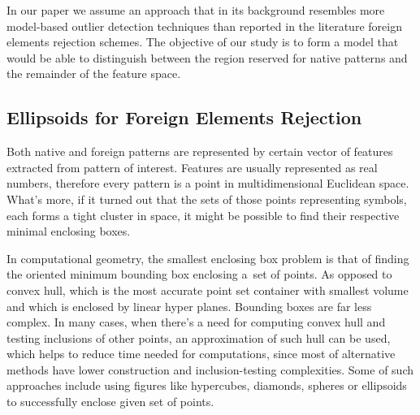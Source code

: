 \documentclass{llncs}
\begin{document}
In our paper we assume an approach that in its background resembles more model-based outlier detection techniques than reported in the literature foreign elements rejection schemes. The objective of our study is to form a model that would be able to distinguish between the region reserved for native patterns and the remainder of the feature space. 


\vspace{-6pt}
\subsection{Ellipsoids for Foreign Elements Rejection}
  \label{sec:Ellipsoids}
\vspace{-3pt}


Both native and foreign patterns are represented by certain vector of features extracted from pattern of interest. Features are usually represented as real numbers, therefore every pattern is a point in multidimensional Euclidean space. What's more, if it turned out that the sets of those points representing symbols, each forms a tight cluster in space, it might be possible to find their respective minimal enclosing boxes.

In computational geometry, the smallest enclosing box problem is that of finding the oriented minimum bounding box enclosing a~set of points. As opposed to convex hull, which is the most accurate point set container with smallest volume and which is enclosed by linear hyper planes. Bounding boxes are far less complex. In many cases, when there's a need for computing convex hull and testing inclusions of other points, an approximation of such hull can be used, which helps to reduce time needed for computations, since most of alternative methods have lower construction and inclusion-testing complexities. Some of such approaches include using figures like hypercubes, diamonds, spheres or ellipsoids to successfully enclose given set of points.
\end{document}
